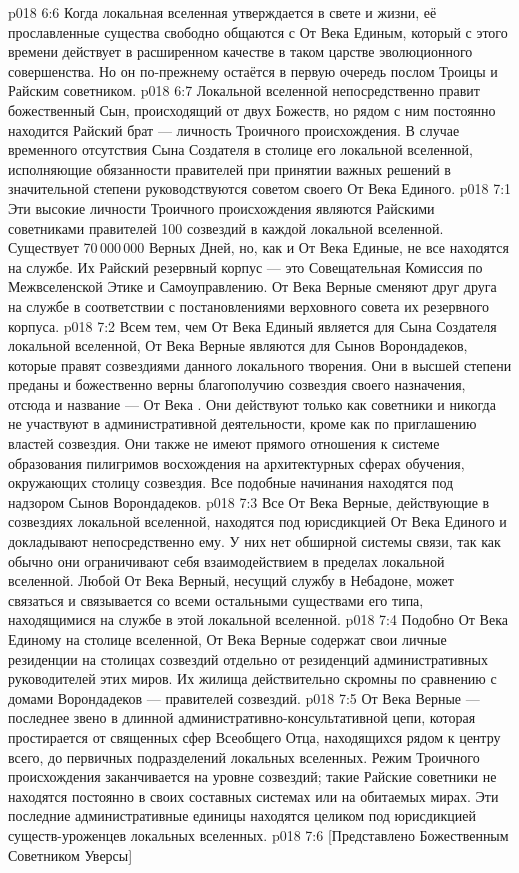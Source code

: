 \vs p018 6:6 Когда локальная вселенная утверждается в свете и жизни, её прославленные существа свободно общаются с От Века Единым, который с этого времени действует в расширенном качестве в таком царстве эволюционного совершенства. Но он по\hyp{}прежнему остаётся в первую очередь послом Троицы и Райским советником.
\vs p018 6:7 Локальной вселенной непосредственно правит божественный Сын, происходящий от двух Божеств, но рядом с ним постоянно находится Райский брат --- личность Троичного происхождения. В случае временного отсутствия Сына Создателя в столице его локальной вселенной, исполняющие обязанности правителей при принятии важных решений в значительной степени руководствуются советом своего От Века Единого.
\vs p018 7:1 Эти высокие личности Троичного происхождения являются Райскими советниками правителей 100 созвездий в каждой локальной вселенной. Существует 70\,000\,000 Верных Дней, но, как и От Века Единые, не все находятся на службе. Их Райский резервный корпус --- это Совещательная Комиссия по Межвселенской Этике и Самоуправлению. От Века Верные сменяют друг друга на службе в соответствии с постановлениями верховного совета их резервного корпуса.
\vs p018 7:2 Всем тем, чем От Века Единый является для Сына Создателя локальной вселенной, От Века Верные являются для Сынов Ворондадеков, которые правят созвездиями данного локального творения. Они в высшей степени преданы и божественно верны благополучию созвездия своего назначения, отсюда и название --- От Века . Они действуют только как советники и никогда не участвуют в административной деятельности, кроме как по приглашению властей созвездия. Они также не имеют прямого отношения к системе образования пилигримов восхождения на архитектурных сферах обучения, окружающих столицу созвездия. Все подобные начинания находятся под надзором Сынов Ворондадеков.
\vs p018 7:3 Все От Века Верные, действующие в созвездиях локальной вселенной, находятся под юрисдикцией От Века Единого и докладывают непосредственно ему. У них нет обширной системы связи, так как обычно они ограничивают себя взаимодействием в пределах локальной вселенной. Любой От Века Верный, несущий службу в Небадоне, может связаться и связывается со всеми остальными существами его типа, находящимися на службе в этой локальной вселенной.
\vs p018 7:4 Подобно От Века Единому на столице вселенной, От Века Верные содержат свои личные резиденции на столицах созвездий отдельно от резиденций административных руководителей этих миров. Их жилища действительно скромны по сравнению с домами Ворондадеков --- правителей созвездий.
\vs p018 7:5 От Века Верные --- последнее звено в длинной административно\hyp{}консультативной цепи, которая простирается от священных сфер Всеобщего Отца, находящихся рядом к центру всего, до первичных подразделений локальных вселенных. Режим Троичного происхождения заканчивается на уровне созвездий; такие Райские советники не находятся постоянно в своих составных системах или на обитаемых мирах. Эти последние административные единицы находятся целиком под юрисдикцией существ\hyp{}уроженцев локальных вселенных.
\vsetoff
\vs p018 7:6 [Представлено Божественным Советником Уверсы]
\quizlink
